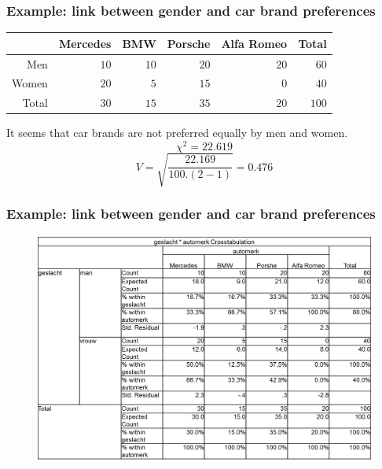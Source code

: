 \documentclass{beamer}
\begin{document}
\begin{frame}
  \frametitle{Example: link between gender and car brand preferences}
  \begin{table}[h] \centering
    \begin{tabular}{@{}rrrrrr@{}}
    	\toprule
    	      & Mercedes &  BMW & Porsche & Alfa Romeo & Total \\ \midrule
    	  Men &     $10$ & $10$ &    $20$ &       $20$ &  $60$ \\
    	Women &     $20$ &  $5$ &    $15$ &        $0$ &  $40$ \\
    	Total &     $30$ & $15$ &    $35$ &       $20$ & $100$ \\ \bottomrule
    \end{tabular}
  \end{table}

  It seems that car brands are not preferred equally by men and women.
  \[ \chi^{2} = 22.619 \]
  \[ V = \sqrt{\frac{22.169}{100 . (2-1)}}  = 0.476\]
\end{frame}

\begin{frame}
  \frametitle{Example: link between gender and car brand preferences}

  \begin{figure}
    \centering
    \includegraphics[width=1.00\textwidth]{img/les3-spssCars.png}
    \label{fig:les3-spssCars}
  \end{figure}

\end{frame}
\end{document}
